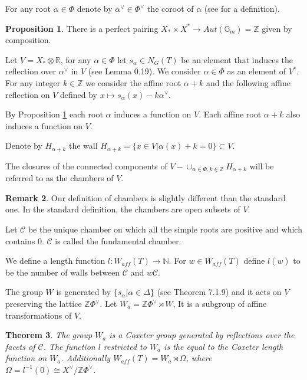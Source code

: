 \documentclass[12pt]{article}
\newcommand{\C}{\mathcal{C}}
\newcommand{\Z}{\mathbb{Z}}
\newcommand{\<}{\langle}
\renewcommand{\>}{\rangle}
\theoremstyle{plain}
\newtheorem{theorem}{Theorem}[section] %
\theoremstyle{definition}
\newtheorem{prop}[theorem]{Proposition}
\newtheorem{Remark}[theorem]{Remark}
\begin{document}
For any root $\alpha\in\Phi$ denote by $\alpha^\vee\in\Phi^\vee$ the coroot of $\alpha$ (see \cite{Springer1998} for a definition).



\begin{prop}\label{2.5}
There is a perfect pairing $X_*\times X^*\rightarrow Aut(\mathbb{G}_m)=\Z$ given by composition. 
\end{prop}


Let $V=X_*\otimes\mathbb{R}$, for any $\alpha\in \Phi$ let $s_\alpha\in N_G(T)$ be an element that induces the reflection over $\alpha^\vee$ in $V$ (see \cite{Landvogt1995ACO} Lemma 0.19).
We consider $\alpha\in \Phi$ as an element of $V^*$. For any integer $k\in\Z$ we consider the affine root $\alpha+k$ and the following affine reflection on $V$ defined by $x\mapsto s_\alpha(x)-k\alpha^\vee$.

By Proposition \ref{2.5} each root $\alpha$ induces a function on $V$. Each affine root $\alpha+k$ also induces a function on $V$.

Denote by $H_{\alpha+k}$ the wall $H_{\alpha+k}=\{x\in V|\alpha(x)+k=0\}\subset V$.

The closures of the connected components of $V-\cup_{\alpha\in \Phi,k\in\Z}H_{\alpha+k}$ will be referred to as the chambers of $V$. 

\begin{Remark}
    Our definition of chambers is slightly different than the standard one. In the standard definition, the chambers are open subsets of $V$.
\end{Remark}

Let $\C$ be the unique chamber on which all the simple roots are positive and which contains $0$. $\C$ is called the fundamental chamber.

We define a length function $l:W_{aff}(T)\rightarrow\mathbb{N}$. For $w\in W_{aff}(T)$ define $l(w)$ to be the number of walls between $\C$ and $w\C$.

The group $W$ is generated by $\{s_\alpha|\alpha\in \Delta\}$ (see \cite{Springer1998} Theorem 7.1.9) and it acts on $V$ preserving the lattice $\Z\Phi^\vee$. Let $W_a=\Z\Phi^\vee\rtimes W$, It is a subgroup of affine transformations of $V$.

\begin{theorem}\label{2.3}
The group $W_a$ is a Coxeter group generated by reflections over the facets of $\C$. The function $l$ restricted to $W_a$ is the equal to the Coxeter length function on $W_a$. Additionally $W_{aff}(T)=W_{a}\rtimes \Omega$, where $\Omega=l^{-1}(0)\cong X^\vee/\Z\Phi^\vee$.
\end{theorem}
\end{document}
